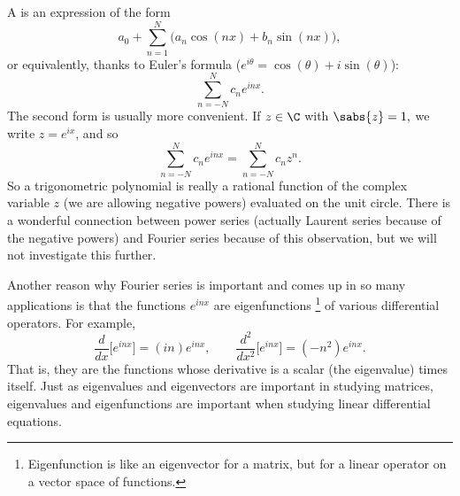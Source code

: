 A \emph{} is an expression of the form
\begin{equation*}
a_0 + \sum_{n=1}^N \bigl(a_n \cos(nx) + b_n \sin(nx) \bigr),
\end{equation*}
or equivalently, thanks to Euler's formula ($e^{i\theta} = \cos(\theta) + i
\sin(\theta)$):
\begin{equation*}
\sum_{n=-N}^N c_n e^{inx} .
\end{equation*}
The second form is usually more convenient.  If
$z \in \C$ with $\sabs{z}=1,$ we write $z = e^{ix}$, and so
\begin{equation*}
\sum_{n=-N}^N c_n e^{inx} = 
\sum_{n=-N}^N c_n z^n .
\end{equation*}
So a trigonometric polynomial is really a rational function
of the complex variable $z$
(we are allowing negative powers) evaluated on the unit circle.  There is
a wonderful connection between power series (actually Laurent series because
of the negative powers) and
Fourier series because of this observation,
but we will not investigate this further.

\medskip

Another reason why Fourier series is important and comes up in so many
applications is that the functions $e^{inx}$ are eigenfunctions%
\footnote{Eigenfunction is like an eigenvector for a matrix, but for a linear
operator on a vector space of functions.} of various
differential operators.  For example,
\begin{equation*}
\frac{d}{dx} \bigl[ e^{inx} \bigr] = (in) e^{inx}, \qquad
\frac{d^2}{dx^2} \bigl[ e^{inx} \bigr] = (-n^2) e^{inx} .
\end{equation*}
That is, they are the functions whose derivative is a scalar (the
eigenvalue) times itself.
Just as eigenvalues and eigenvectors are important in studying matrices,
eigenvalues and eigenfunctions are important when studying linear
differential equations.

\medskip

